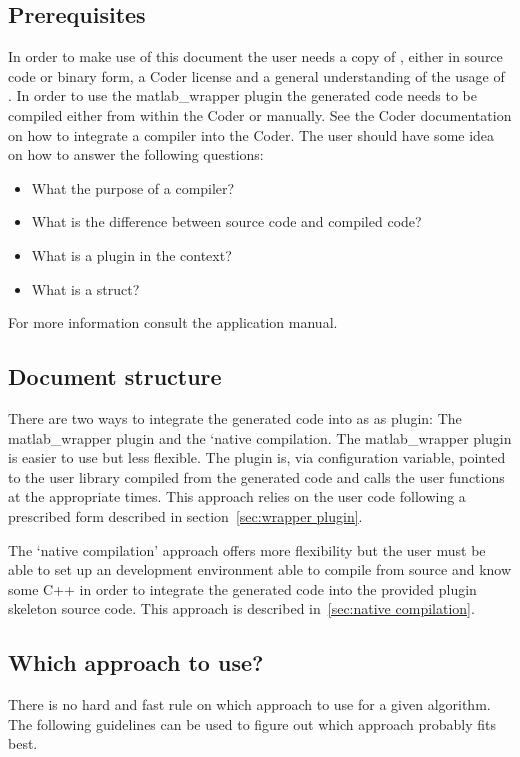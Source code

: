 \documentclass[11pt,a4paper,twoside]{article}
\newcommand{\+}{\discretionary{\mbox{\scriptsize$\hookleftarrow$}}{}{}}
\begin{document}
\subsection*{Prerequisites}
In order to make use of this document the user needs a copy of \mha{}, either
in source code or binary form, a \Matlab{} Coder license and a general
understanding of the usage of \mha{}. In order to use the matlab\_wrapper plugin
the generated code needs to be compiled either from within the \Matlab{} Coder
or manually. See the \Matlab{} Coder documentation on how to integrate a compiler
into the Coder.
The user should have some idea on how to answer the following questions:
\begin{itemize}
\item What the purpose of a compiler?
\item What is the difference between source code and compiled code?
\item What is a plugin in the \mha{} context?
\item What is a \Matlab{} struct?
\end{itemize}
For more information consult the \mha{} application manual.

\subsection*{Document structure}
There are two ways to integrate the generated code into \mha{} as 
as plugin: The matlab\_wrapper plugin and the `native compilation. The matlab\_wrapper
plugin is easier to use but less flexible. The plugin is, via configuration variable, pointed to the user library compiled
from the generated code and calls the user functions at the appropriate times.
This approach relies on the user code following a prescribed form described in section~\ref{sec:wrapper plugin}.

The `native compilation' approach offers more flexibility but the user must be able to set up an development environment
able to compile \mha{} from source and know some C++ in order to integrate the generated code into the provided plugin
skeleton source code. This approach is described in~\ref{sec:native compilation}.

\subsection*{Which approach to use?}
There is no hard and fast rule on which approach to use for a given algorithm. The
following guidelines can be used to figure out which approach probably fits best.
\end{document}
